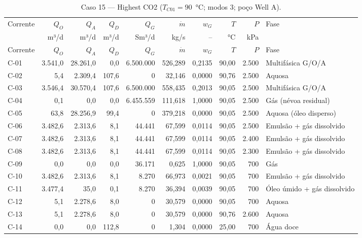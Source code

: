\documentclass[11pt,a4paper]{article}
\numberwithin{equation}{section}
\numberwithin{table}{section}
\numberwithin{figure}{section}
\begin{document}
{\footnotesize\setlength{\tabcolsep}{3pt}\begin{longtable}{lrrrrrrrrL{2.5cm}}
\caption{Caso 15 --- Highest CO2 ($T_{C01}=90$~°C; modos 3; poço Well A).}\\\toprule
Corrente & $Q_O$ & $Q_A$ & $Q_D$ & $Q_G$ & $\dot m$ & $w_G$ & $T$ & $P$ & Fase\\ & m³/d & m³/d & m³/d & Sm³/d & kg/s & -- & °C & kPa & \\\midrule\endfirsthead
\toprule Corrente & $Q_O$ & $Q_A$ & $Q_D$ & $Q_G$ & $\dot m$ & $w_G$ & $T$ & $P$ & Fase\\\midrule\endhead
C-01 & 3.541,0 & 28.261,0 & 0,0 & 6.500.000 & 526,289 & 0,2135 & 90,00 & 2.500 & {\scriptsize Multifásica G/O/A}\\
C-02 & 5,4 & 2.309,4 & 107,6 & 0 & 32,146 & 0,0000 & 90,76 & 2.500 & {\scriptsize Aquosa}\\
C-03 & 3.546,4 & 30.570,4 & 107,6 & 6.500.000 & 558,435 & 0,2013 & 90,05 & 2.500 & {\scriptsize Multifásica G/O/A}\\
C-04 & 0,1 & 0,0 & 0,0 & 6.455.559 & 111,618 & 1,0000 & 90,05 & 2.500 & {\scriptsize Gás (névoa residual)}\\
C-05 & 63,8 & 28.256,9 & 99,4 & 0 & 379,218 & 0,0000 & 90,05 & 2.500 & {\scriptsize Aquosa (óleo disperso)}\\
C-06 & 3.482,6 & 2.313,6 & 8,1 & 44.441 & 67,599 & 0,0114 & 90,05 & 2.500 & {\scriptsize Emulsão + gás dissolvido}\\
C-07 & 3.482,6 & 2.313,6 & 8,1 & 44.441 & 67,599 & 0,0114 & 90,05 & 2.400 & {\scriptsize Emulsão + gás dissolvido}\\
C-08 & 3.482,6 & 2.313,6 & 8,1 & 44.441 & 67,599 & 0,0114 & 90,05 & 2.300 & {\scriptsize Emulsão + gás dissolvido}\\
C-09 & 0,0 & 0,0 & 0,0 & 36.171 & 0,625 & 1,0000 & 90,05 & 700 & {\scriptsize Gás}\\
C-10 & 3.482,6 & 2.313,6 & 8,1 & 8.270 & 66,973 & 0,0021 & 90,05 & 700 & {\scriptsize Emulsão + gás dissolvido}\\
C-11 & 3.477,4 & 35,0 & 0,1 & 8.270 & 36,394 & 0,0039 & 90,05 & 700 & {\scriptsize Óleo úmido + gás dissolvido}\\
C-12 & 5,1 & 2.278,6 & 8,0 & 0 & 30,579 & 0,0000 & 90,05 & 700 & {\scriptsize Aquosa}\\
C-13 & 5,1 & 2.278,6 & 8,0 & 0 & 30,579 & 0,0000 & 90,76 & 2.600 & {\scriptsize Aquosa}\\
C-14 & 0,0 & 0,0 & 112,8 & 0 & 1,304 & 0,0000 & 25,00 & 700 & {\scriptsize Água doce}\\

\end{longtable}}
\end{document}
